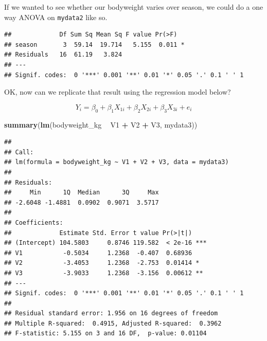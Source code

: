 \documentclass[]{book}
\newenvironment{Shaded}{\begin{snugshade}}{\end{snugshade}}
\newcommand{\CommentTok}[1]{\textcolor[rgb]{0.56,0.35,0.01}{\textit{#1}}}
\newcommand{\DataTypeTok}[1]{\textcolor[rgb]{0.13,0.29,0.53}{#1}}
\newcommand{\KeywordTok}[1]{\textcolor[rgb]{0.13,0.29,0.53}{\textbf{#1}}}
\newcommand{\NormalTok}[1]{#1}
\newcommand{\OperatorTok}[1]{\textcolor[rgb]{0.81,0.36,0.00}{\textbf{#1}}}
\newcommand{\StringTok}[1]{\textcolor[rgb]{0.31,0.60,0.02}{#1}}
\begin{document}
If we wanted to see whether our bodyweight varies over season, we could do a one way ANOVA on \texttt{mydata2} like so.

\begin{Shaded}
\end{Shaded}

\begin{verbatim}
##             Df Sum Sq Mean Sq F value Pr(>F)  
## season       3  59.14  19.714   5.155  0.011 *
## Residuals   16  61.19   3.824                 
## ---
## Signif. codes:  0 '***' 0.001 '**' 0.01 '*' 0.05 '.' 0.1 ' ' 1
\end{verbatim}

OK, now can we replicate that result using the regression model below?

\[Y_i = \beta_0 + \beta_1 X_{1i} + \beta_2 X_{2i} + \beta_3 X_{3i} + e_i\]

\begin{Shaded}
\begin{Highlighting}[]
\KeywordTok{summary}\NormalTok{(}\KeywordTok{lm}\NormalTok{(bodyweight_kg }\OperatorTok{~}\StringTok{ }\NormalTok{V1 }\OperatorTok{+}\StringTok{ }\NormalTok{V2 }\OperatorTok{+}\StringTok{ }\NormalTok{V3, mydata3))}
\end{Highlighting}
\end{Shaded}

\begin{verbatim}
## 
## Call:
## lm(formula = bodyweight_kg ~ V1 + V2 + V3, data = mydata3)
## 
## Residuals:
##     Min      1Q  Median      3Q     Max 
## -2.6048 -1.4881  0.0902  0.9071  3.5717 
## 
## Coefficients:
##             Estimate Std. Error t value Pr(>|t|)    
## (Intercept) 104.5803     0.8746 119.582  < 2e-16 ***
## V1           -0.5034     1.2368  -0.407  0.68936    
## V2           -3.4053     1.2368  -2.753  0.01414 *  
## V3           -3.9033     1.2368  -3.156  0.00612 ** 
## ---
## Signif. codes:  0 '***' 0.001 '**' 0.01 '*' 0.05 '.' 0.1 ' ' 1
## 
## Residual standard error: 1.956 on 16 degrees of freedom
## Multiple R-squared:  0.4915,	Adjusted R-squared:  0.3962 
## F-statistic: 5.155 on 3 and 16 DF,  p-value: 0.01104
\end{verbatim}
\end{document}
